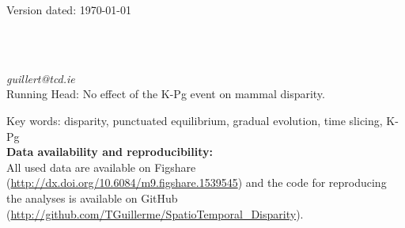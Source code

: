 \documentclass[12pt,letterpaper]{article}
\begin{document}
\begin{flushright}
Version dated: \today
\end{flushright}
\bigskip
\begin{center}

\bigskip

\\
\\
\end{center}
\medskip
{} \textit{guillert@tcd.ie}\\  

\bigskip
\noindent Running Head: No effect of the K-Pg event on mammal disparity.

\bigskip
\noindent Key words: disparity, punctuated equilibrium, gradual evolution, time slicing, K-Pg\\

\bigskip
\noindent \textbf{Data availability and reproducibility:}\\
\noindent All used data are available on Figshare (\url{http://dx.doi.org/10.6084/m9.figshare.1539545}) and the code for reproducing the analyses is available on GitHub (\url{http://github.com/TGuillerme/SpatioTemporal_Disparity}).


\modulolinenumbers[1]
\linenumbers



\end{document}
